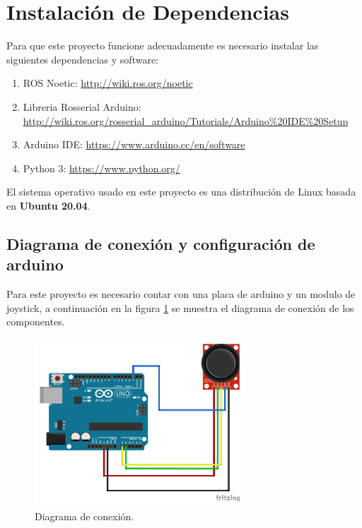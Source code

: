 \documentclass{article}
\begin{document}
\section{Instalación de Dependencias}

Para que este proyecto funcione adecuadamente es necesario instalar las siguientes dependencias y software:

\begin{enumerate}
  \item ROS Noetic: \url{http://wiki.ros.org/noetic}
  \item Libreria Rosserial Arduino: \url{http://wiki.ros.org/rosserial_arduino/Tutorials/Arduino%20IDE%20Setup}
  \item Arduino IDE: \url{https://www.arduino.cc/en/software}
  \item Python 3: \url{https://www.python.org/}
\end{enumerate}

El sistema operativo usado en este proyecto es una distribución de Linux basada en \textbf{Ubuntu 20.04}.





\subsection{Diagrama de conexión y configuración de arduino}


Para este proyecto es necesario contar con una placa de arduino y un modulo de joystick, a continuación en la figura \ref{fig:diagrama} se muestra el diagrama de conexión de los componentes.


\begin{figure}[H]
  \centering
  \includegraphics[width=0.7\textwidth]{images/diagrama_conexiones.pdf}
  \caption{Diagrama de conexión.}
  \label{fig:diagrama}
\end{figure}
\end{document}
